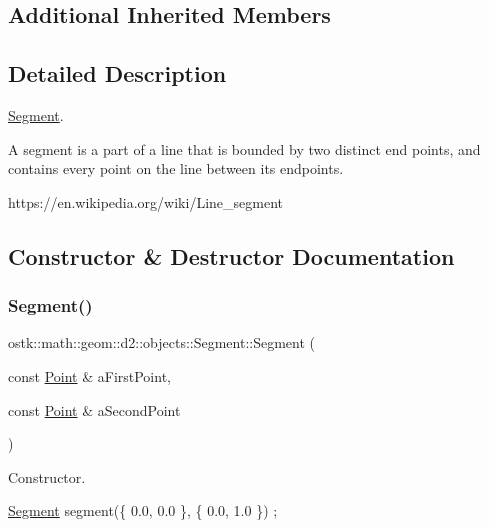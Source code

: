 \subsection*{Additional Inherited Members}


\subsection{Detailed Description}
\hyperlink{classostk_1_1math_1_1geom_1_1d2_1_1objects_1_1_segment}{Segment}. 

A segment is a part of a line that is bounded by two distinct end points, and contains every point on the line between its endpoints.

https\+://en.wikipedia.\+org/wiki/\+Line\+\_\+segment 

\subsection{Constructor \& Destructor Documentation}
\mbox{\label{classostk_1_1math_1_1geom_1_1d2_1_1objects_1_1_segment_a56c91f22315d7cefe9d5e9973330028d}} 
\subsubsection{\texorpdfstring{Segment()}{Segment()}}
{\footnotesize\ttfamily ostk\+::math\+::geom\+::d2\+::objects\+::\+Segment\+::\+Segment (\begin{DoxyParamCaption}\item[{const \hyperlink{classostk_1_1math_1_1geom_1_1d2_1_1objects_1_1_point}{Point} \&}]{a\+First\+Point,  }\item[{const \hyperlink{classostk_1_1math_1_1geom_1_1d2_1_1objects_1_1_point}{Point} \&}]{a\+Second\+Point }\end{DoxyParamCaption})}



Constructor. 


\begin{DoxyCode}
\hyperlink{classostk_1_1math_1_1geom_1_1d2_1_1objects_1_1_segment_a56c91f22315d7cefe9d5e9973330028d}{Segment} segment(\{ 0.0, 0.0 \}, \{ 0.0, 1.0 \}) ;
\end{DoxyCode}



